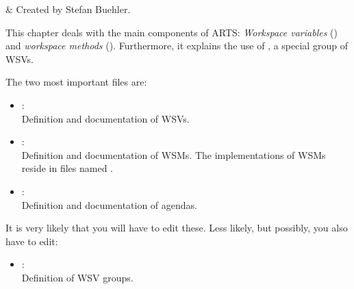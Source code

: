 
\label{sec:agendas}

 & Created by Stefan Buehler.\\
\stophistory

This chapter deals with the main components of ARTS: \emph{Workspace
  variables} () and
\emph{workspace methods} ().
Furthermore, it explains the use of , a special
group of WSVs.



\label{sec:agendas:files}

The two most important files are:
\begin{itemize}
\item {}:\\
  Definition and documentation of WSVs.
\item{}:\\
  Definition and documentation of WSMs. The
  implementations of WSMs reside in files named
  .
\item {}:\\
  Definition and documentation of agendas.
\end{itemize}
It is very likely that you will have to edit these. Less likely, but
possibly, you also have to edit:
\begin{itemize}
\item {}:\\
  Definition of WSV groups.
\end{itemize}

